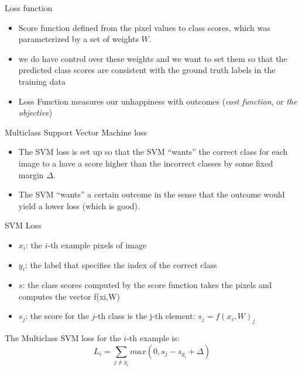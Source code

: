 \documentclass[14 pt]{beamer}
\let\olditem\item
\renewcommand{\item}{\olditem\vspace{4pt}}
\begin{document}
\begin{frame}{Loss function}
  \begin{itemize}
  \item Score function defined from the pixel values to class scores, which
    was parameterized by a set of weights $W$. 
  \item we do have control over these weights and we want to set them so that
    the predicted class scores are consistent with the ground truth labels
    in the training data
  \item Loss Function  measures our unhappiness with outcomes (\emph{cost
    function}, or \emph{the objective})
\end{itemize}
\end{frame}

\begin{frame}{  Multiclass Support Vector Machine loss}
  \begin{itemize}
  \item The SVM loss is set up so that the SVM ``wants'' the correct class
    for each image to a have a score higher than the incorrect classes by
    some fixed margin $\Delta$. 
  \item The SVM ``wants'' a certain outcome in the sense that the outcome
    would yield a lower loss (which is good).
  \end{itemize}
\end{frame}

\begin{frame}{SVM Loss}
  \begin{itemize}
  \item  $x_i$: the $i$-th example pixels of image 
  \item $y_i$: the label that specifies the index of the correct class
  \item $s$: the class scores computed by the score function takes the pixels and computes the vector
    f(xi,W) 
  \item $s_j$:  the score for the $j$-th class is the j-th element:
    $s_j=f(x_i,W)_j$
  \end{itemize}
\end{frame}

\begin{frame}{}
   The Multiclass SVM loss for the $i$-th example is:
   \begin{displaymath}
     L_i = \sum_{j\neq y_i}max(0, s_j-s_{y_i}+\Delta)
   \end{displaymath}
\end{frame}
\end{document}
